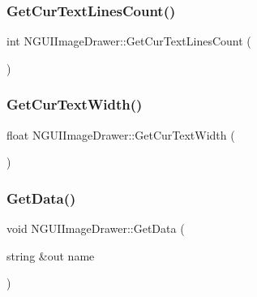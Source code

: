 \hypertarget{class_n_g_u_i_image_drawer_aa2372f7a29659c565da6b6713bc59f79}{}\label{class_n_g_u_i_image_drawer_aa2372f7a29659c565da6b6713bc59f79} 
\subsubsection{\texorpdfstring{Get\+Cur\+Text\+Lines\+Count()}{GetCurTextLinesCount()}}
{\footnotesize\ttfamily int N\+G\+U\+I\+Image\+Drawer\+::\+Get\+Cur\+Text\+Lines\+Count (\begin{DoxyParamCaption}{ }\end{DoxyParamCaption})}

\hypertarget{class_n_g_u_i_image_drawer_aefbb259b2c2ee4f495bc0af54f6ea18d}{}\label{class_n_g_u_i_image_drawer_aefbb259b2c2ee4f495bc0af54f6ea18d} 
\subsubsection{\texorpdfstring{Get\+Cur\+Text\+Width()}{GetCurTextWidth()}}
{\footnotesize\ttfamily float N\+G\+U\+I\+Image\+Drawer\+::\+Get\+Cur\+Text\+Width (\begin{DoxyParamCaption}{ }\end{DoxyParamCaption})}

\hypertarget{class_n_g_u_i_image_drawer_abe5372ff63cef584ae8653f948f2e37f}{}\label{class_n_g_u_i_image_drawer_abe5372ff63cef584ae8653f948f2e37f} 
\subsubsection{\texorpdfstring{Get\+Data()}{GetData()}}
{\footnotesize\ttfamily void N\+G\+U\+I\+Image\+Drawer\+::\+Get\+Data (\begin{DoxyParamCaption}\item[{string \&out}]{name }\end{DoxyParamCaption})}

\hypertarget{class_n_g_u_i_image_drawer_a094666492b9da95eb64465f9e7f0975e}{}\label{class_n_g_u_i_image_drawer_a094666492b9da95eb64465f9e7f0975e} 

